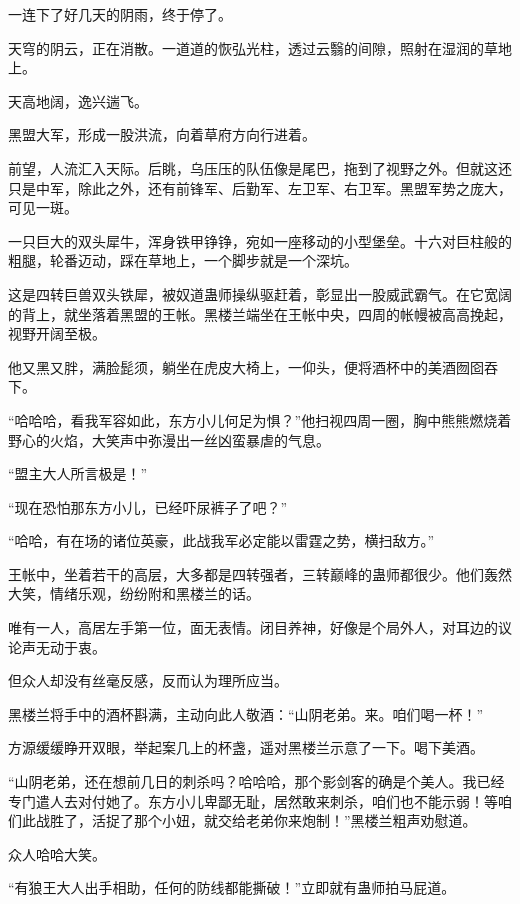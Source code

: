 
\begin{this_body}

一连下了好几天的阴雨，终于停了。

天穹的阴云，正在消散。一道道的恢弘光柱，透过云翳的间隙，照射在湿润的草地上。

天高地阔，逸兴遄飞。

黑盟大军，形成一股洪流，向着草府方向行进着。

前望，人流汇入天际。后眺，乌压压的队伍像是尾巴，拖到了视野之外。但就这还只是中军，除此之外，还有前锋军、后勤军、左卫军、右卫军。黑盟军势之庞大，可见一斑。

一只巨大的双头犀牛，浑身铁甲铮铮，宛如一座移动的小型堡垒。十六对巨柱般的粗腿，轮番迈动，踩在草地上，一个脚步就是一个深坑。

这是四转巨兽双头铁犀，被奴道蛊师操纵驱赶着，彰显出一股威武霸气。在它宽阔的背上，就坐落着黑盟的王帐。黑楼兰端坐在王帐中央，四周的帐幔被高高挽起，视野开阔至极。

他又黑又胖，满脸髭须，躺坐在虎皮大椅上，一仰头，便将酒杯中的美酒囫囵吞下。

“哈哈哈，看我军容如此，东方小儿何足为惧？”他扫视四周一圈，胸中熊熊燃烧着野心的火焰，大笑声中弥漫出一丝凶蛮暴虐的气息。

“盟主大人所言极是！”

“现在恐怕那东方小儿，已经吓尿裤子了吧？”

“哈哈，有在场的诸位英豪，此战我军必定能以雷霆之势，横扫敌方。”

王帐中，坐着若干的高层，大多都是四转强者，三转巅峰的蛊师都很少。他们轰然大笑，情绪乐观，纷纷附和黑楼兰的话。

唯有一人，高居左手第一位，面无表情。闭目养神，好像是个局外人，对耳边的议论声无动于衷。

但众人却没有丝毫反感，反而认为理所应当。

黑楼兰将手中的酒杯斟满，主动向此人敬酒：“山阴老弟。来。咱们喝一杯！”

方源缓缓睁开双眼，举起案几上的杯盏，遥对黑楼兰示意了一下。喝下美酒。

“山阴老弟，还在想前几日的刺杀吗？哈哈哈，那个影剑客的确是个美人。我已经专门遣人去对付她了。东方小儿卑鄙无耻，居然敢来刺杀，咱们也不能示弱！等咱们此战胜了，活捉了那个小妞，就交给老弟你来炮制！”黑楼兰粗声劝慰道。

众人哈哈大笑。

“有狼王大人出手相助，任何的防线都能撕破！”立即就有蛊师拍马屁道。


\end{this_body}

